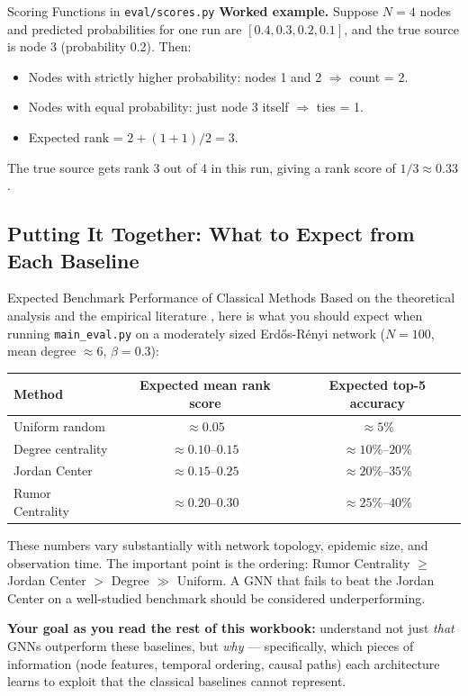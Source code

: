 \begin{codewalk}{Scoring Functions in \texttt{eval/scores.py}}
\textbf{Worked example.} Suppose $N = 4$ nodes and predicted probabilities for one run
are $[0.4, 0.3, 0.2, 0.1]$, and the true source is node 3 (probability 0.2). Then:
\begin{itemize}
  \item Nodes with strictly higher probability: nodes 1 and 2 $\Rightarrow$ count = 2.
  \item Nodes with equal probability: just node 3 itself $\Rightarrow$ ties = 1.
  \item Expected rank = $2 + (1 + 1)/2 = 3$.
\end{itemize}
The true source gets rank 3 out of 4 in this run, giving a rank score of $1/3 \approx 0.33$.
\end{codewalk}

\subsection{Putting It Together: What to Expect from Each Baseline}

\begin{keyinsight}{Expected Benchmark Performance of Classical Methods}
Based on the theoretical analysis and the empirical literature \cite{Sterchi2025},
here is what you should expect when running \texttt{main\_eval.py} on a moderately
sized Erd\H{o}s-R\'{e}nyi network ($N = 100$, mean degree $\approx 6$, $\beta = 0.3$):

\begin{center}
\small
\begin{tabular}{lcc}
\toprule
Method & Expected mean rank score & Expected top-5 accuracy \\
\midrule
Uniform random    & $\approx 0.05$  & $\approx 5\%$  \\
Degree centrality & $\approx 0.10$--$0.15$ & $\approx 10\%$--$20\%$ \\
Jordan Center     & $\approx 0.15$--$0.25$ & $\approx 20\%$--$35\%$ \\
Rumor Centrality  & $\approx 0.20$--$0.30$ & $\approx 25\%$--$40\%$ \\
\bottomrule
\end{tabular}
\end{center}

These numbers vary substantially with network topology, epidemic size, and observation
time. The important point is the ordering: Rumor Centrality $\geq$ Jordan Center $>$
Degree $\gg$ Uniform. A GNN that fails to beat the Jordan Center on a well-studied
benchmark should be considered underperforming.

\medskip
\textbf{Your goal as you read the rest of this workbook:} understand not just \emph{that}
GNNs outperform these baselines, but \emph{why} --- specifically, which pieces of
information (node features, temporal ordering, causal paths) each architecture learns
to exploit that the classical baselines cannot represent.
\end{keyinsight}


